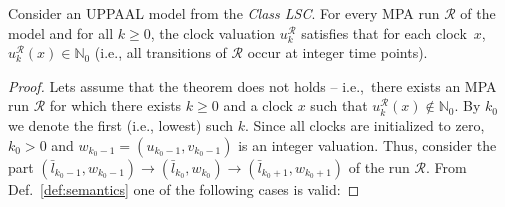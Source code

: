 \begin{theorem}
\label{thm:basic_mpa}
Consider an UPPAAL model from the \textit{Class LSC}. For every MPA run $\mathcal{R}$ of the model
and for all $k\geq 0$, the clock valuation $u^{\mathcal{R}}_k$ satisfies that for each clock~$x$, $u^{\mathcal{R}}_k(x)\in \mathbb{N}_0$ (i.e., all transitions of $\mathcal{R}$ occur at integer time points).
\end{theorem}

\begin{proof}
Lets assume that the theorem does not holds -- i.e.,~there exists an MPA run $\mathcal{R}$ for which there exists $k\geq 0$ and a clock $x$ such that $u^{\mathcal{R}}_k(x)\notin \mathbb{N}_0$. By $k_0$ we denote the first (i.e., lowest) such $k$. Since all clocks are initialized to zero, $k_0>0$ and $w_{k_0-1}=(u_{k_0-1},v_{k_0-1})$ is an integer valuation. Thus, consider the part    
$(\bar{l}_{k_0-1},w_{k_0-1}) \rightarrow (\bar{l}_{k_0},w_{k_0}) \rightarrow (\bar{l}_{k_0+1},w_{k_0+1})$ of the run $\mathcal{R}$. From Def.~\ref{def:semantics} one of the following cases is valid:


\end{proof}

